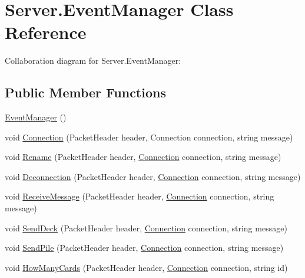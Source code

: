 \hypertarget{class_server_1_1_event_manager}{}\section{Server.\+Event\+Manager Class Reference}
\label{class_server_1_1_event_manager}


Collaboration diagram for Server.\+Event\+Manager\+:
\subsection*{Public Member Functions}
\begin{DoxyCompactItemize}
\item 
\hyperlink{class_server_1_1_event_manager_a6d3c4760909d6aea6f5f8b1049fc4d4b}{Event\+Manager} ()
\item 
void \hyperlink{class_server_1_1_event_manager_a3159a84121b61e97716c80eed301d03b}{Connection} (Packet\+Header header, Connection connection, string message)
\item 
void \hyperlink{class_server_1_1_event_manager_a77c5e8ff58fa19d37760c43584f6f157}{Rename} (Packet\+Header header, \hyperlink{class_server_1_1_event_manager_a3159a84121b61e97716c80eed301d03b}{Connection} connection, string message)
\item 
void \hyperlink{class_server_1_1_event_manager_a1b1ceacd3c4a3b4db33be78ee071de19}{Deconnection} (Packet\+Header header, \hyperlink{class_server_1_1_event_manager_a3159a84121b61e97716c80eed301d03b}{Connection} connection, string message)
\item 
void \hyperlink{class_server_1_1_event_manager_a546cd038c958d8f5fdb0640163e296fd}{Receive\+Message} (Packet\+Header header, \hyperlink{class_server_1_1_event_manager_a3159a84121b61e97716c80eed301d03b}{Connection} connection, string message)
\item 
void \hyperlink{class_server_1_1_event_manager_a025cdd6503991641c982fbac699d5a1f}{Send\+Deck} (Packet\+Header header, \hyperlink{class_server_1_1_event_manager_a3159a84121b61e97716c80eed301d03b}{Connection} connection, string message)
\item 
void \hyperlink{class_server_1_1_event_manager_ab617c26d4e2cb7bd55fd3c1b96007b4f}{Send\+Pile} (Packet\+Header header, \hyperlink{class_server_1_1_event_manager_a3159a84121b61e97716c80eed301d03b}{Connection} connection, string message)
\item 
void \hyperlink{class_server_1_1_event_manager_a8ff188a9490f6a67f38ce50d6b03efe8}{How\+Many\+Cards} (Packet\+Header header, \hyperlink{class_server_1_1_event_manager_a3159a84121b61e97716c80eed301d03b}{Connection} connection, string id)

\end{DoxyCompactItemize}
